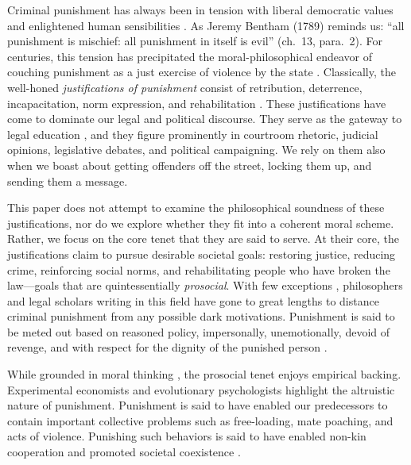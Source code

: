
Criminal punishment has always been in tension with liberal democratic values and enlightened human sensibilities \citep{Allen1999}. As Jeremy Bentham (1789) reminds us: ``all punishment is mischief: all punishment in itself is evil'' (ch.~13, para.~2). For centuries, this tension has precipitated the moral-philosophical endeavor of couching punishment as a just exercise of violence by the state \citep{Allen1999, Tonry2011}. Classically, the well-honed \textit{justifications of punishment} consist of retribution, deterrence, incapacitation, norm expression, and rehabilitation \citep[see][]{Norrie2014, Tonry2011}. These justifications have come to dominate our legal and political discourse. They serve as the gateway to legal education \citep{Ristroph2006}, and they figure prominently in courtroom rhetoric, judicial opinions, legislative debates, and political campaigning. We rely on them also when we boast about getting offenders off the street, locking them up, and sending them a message.

This paper does not attempt to examine the philosophical soundness of these justifications, nor do we explore whether they fit into a coherent moral scheme. Rather, we focus on the core tenet that they are said to serve. At their core, the justifications claim to pursue desirable societal goals: restoring justice, reducing crime, reinforcing social norms, and rehabilitating people who have broken the law---goals that are quintessentially \textit{prosocial}. With few exceptions \citep[e.g.,][]{Stephen1883}, philosophers and legal scholars writing in this field have gone to great lengths to distance criminal punishment from any possible dark motivations. Punishment is said to be meted out based on reasoned policy, impersonally, unemotionally, devoid of revenge, and with respect for the dignity of the punished person \citep[see][see also \citealp{Allen1999}]{Bentham1789, Kant1797, Rawls1955}.

While grounded in moral thinking \citep{Allen1999, Tonry2011}, the prosocial tenet enjoys empirical backing. Experimental economists and evolutionary psychologists highlight the altruistic nature of punishment. Punishment is said to have enabled our predecessors to contain important collective problems such as free-loading, mate poaching, and acts of violence. Punishing such behaviors is said to have enabled non-kin cooperation and promoted societal coexistence \citep{BowlesGintis2011, PriceCosmidesTooby2002, ShinadaYamagishi2007, FehrFischbacher2003, FehrFischbacher2004, FehrGachter2000, FehrGachter2002}.

